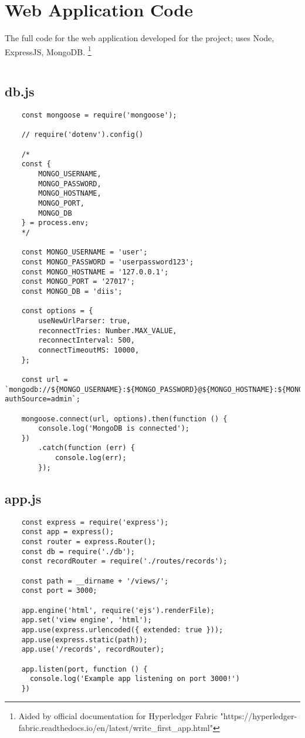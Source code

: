 \section{Web Application Code}
The full code for the web application developed for the project; uses Node, ExpressJS, MongoDB. \footnote{Aided by official documentation for Hyperledger Fabric "https://hyperledger-fabric.readthedocs.io/en/latest/write\_first\_app.html"} \label{appendix:webapp}
\begin{lstlisting}[caption={Web application for DIIS.}]

\end{lstlisting}


\subsection{db.js}
\label{appendix:dbjs}
\begin{lstlisting}
    const mongoose = require('mongoose');

    // require('dotenv').config()
    
    /*
    const {
        MONGO_USERNAME,
        MONGO_PASSWORD,
        MONGO_HOSTNAME,
        MONGO_PORT,
        MONGO_DB
    } = process.env;
    */
    
    const MONGO_USERNAME = 'user';
    const MONGO_PASSWORD = 'userpassword123';
    const MONGO_HOSTNAME = '127.0.0.1';
    const MONGO_PORT = '27017';
    const MONGO_DB = 'diis';
    
    const options = {
        useNewUrlParser: true,
        reconnectTries: Number.MAX_VALUE,
        reconnectInterval: 500,
        connectTimeoutMS: 10000,
    };
    
    const url = `mongodb://${MONGO_USERNAME}:${MONGO_PASSWORD}@${MONGO_HOSTNAME}:${MONGO_PORT}/${MONGO_DB}?authSource=admin`;
    
    mongoose.connect(url, options).then(function () {
        console.log('MongoDB is connected');
    })
        .catch(function (err) {
            console.log(err);
        });
\end{lstlisting}


\subsection{app.js}
\label{appendix:appjs}
\begin{lstlisting}
    const express = require('express');
    const app = express();
    const router = express.Router();
    const db = require('./db');
    const recordRouter = require('./routes/records');
    
    const path = __dirname + '/views/';
    const port = 3000;
    
    app.engine('html', require('ejs').renderFile);
    app.set('view engine', 'html');
    app.use(express.urlencoded({ extended: true }));
    app.use(express.static(path));
    app.use('/records', recordRouter);
    
    app.listen(port, function () {
      console.log('Example app listening on port 3000!')
    })
\end{lstlisting}



